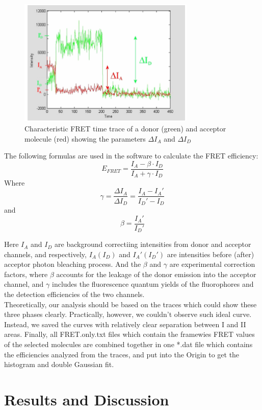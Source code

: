 \documentclass[a4paper,english,12pt,bibliography=totoc]{scrreprt}
\begin{document}
\begin{figure}
    \centering
    \includegraphics[width = 0.75\textwidth]{images/parameters.png}
    \caption{Characteristic FRET time trace of a donor (green) and acceptor molecule (red) showing the parameters $\Delta I_A$ and $\Delta I_D$ }
\end{figure}

The following formulas are used in the software to calculate the FRET efficiency:
\[
E_{FRET} = \frac{I_A - \beta \cdot I_D}{I_A + \gamma \cdot I_D}
\]
Where
\[
\gamma = \frac{\Delta I_A}{\Delta I_D} = \frac{I_A - I_A'}{I_D' - I_D}
\]
and
\[
\beta = \frac{I_A'}{I_D'}
\]

Here $I_A$ and $I_D$ are background correctiing intensities from donor and acceptor channels, and respectively, $I_A (I_D)$  and $I_A' (I_D')$ are intensities before (after) acceptor photon bleaching process. And the $\beta$ and $\gamma$ are experimental correction factors, where $\beta$ accounts for the leakage of the donor emission into the acceptor channel, and $\gamma$ includes the fluorescence quantum yields of the fluorophores and the detection efficiencies of the two channels.\\

Theoretically, our analysis should be based on the traces which could show these three phases clearly. Practically, however, we couldn't observe such ideal curve. Instead, we saved the curves with relatively clear separation between I and II areas. Finally, all FRET.only.txt files which contain the framewies FRET values of the selected molecules are combined together in one *.dat file which contains the efficiencies analyzed from the traces, and put into the Origin to get the histogram and double Gaussian fit. 


\chapter{Results and Discussion}
\label{cha:ResultsandDiscussion}
\end{document}
